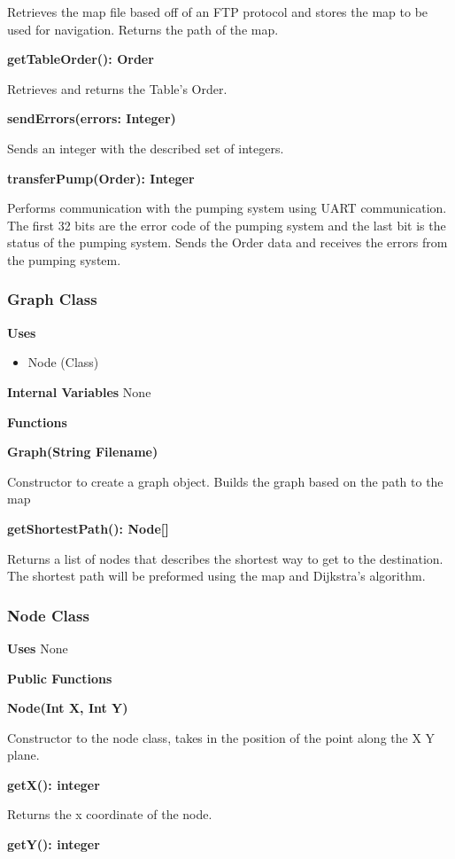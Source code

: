 \documentclass [10pt]{article}
\begin{document}
Retrieves the map file based off of an FTP protocol and stores the map to be used for navigation. Returns the path of the map.

\textbf{getTableOrder(): Order}

Retrieves and returns the Table's Order.

\textbf{sendErrors(errors: Integer)}

 Sends an integer with the described set of integers. 
 
\textbf{transferPump(Order): Integer}

 Performs communication with the pumping system using UART communication. The first 32 bits are the error code of the pumping system and the last bit is the status of the pumping system. Sends the Order data and receives the errors from the pumping system.

\subsubsection{Graph Class}
\textbf{Uses}
\begin{itemize}
	\item Node (Class)
\end{itemize}

\textbf{Internal Variables}
None 

\textbf{Functions}

\textbf{Graph(String Filename)}

Constructor to create a graph object. Builds the graph based on the path to the map

\textbf{getShortestPath(): Node[]}

Returns a list of nodes that describes the shortest way to get to the destination.  The shortest path will be preformed using the map and Dijkstra's algorithm.


\subsubsection{Node Class}
\textbf{Uses}
None 

\textbf{Public Functions}

\textbf{Node(Int X, Int Y)}

Constructor to the node class, takes in the position of the point along the X Y plane.

\textbf{getX(): integer}

Returns the x coordinate of the node.

\textbf{getY(): integer}
\end{document}
